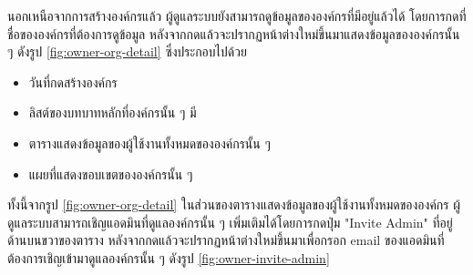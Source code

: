 \clearpage

นอกเหนือจากการสร้างองค์กรแล้ว ผู้ดูแลระบบยังสามารถดูข้อมูลขององค์กรที่มีอยู่แล้วได้ โดยการกดที่ชื่อขององค์กรที่ต้องการดูข้อมูล หลังจากกดแล้วจะปรากฏหน้าต่างใหม่ขึ้นมาแสดงข้อมูลขององค์กรนั้น ๆ ดังรูป \ref{fig:owner-org-detail} ซึ่งประกอบไปด้วย
\begin{itemize}
    \item วันที่กดสร้างองค์กร
    \item ลิสต์ของบทบาทหลักที่องค์กรนั้น ๆ มี
    \item ตารางแสดงข้อมูลของผู้ใช้งานทั้งหมดขององค์กรนั้น ๆ
    \item แผยที่แสดงขอบเขตขององค์กรนั้น ๆ
\end{itemize}
ทั้งนี้จากรูป \ref{fig:owner-org-detail} ในส่วนของตารางแสดงข้อมูลของผู้ใช้งานทั้งหมดขององค์กร ผู้ดูแลระบบสามารถเชิญแอดมินที่ดูแลองค์กรนั้น ๆ เพิ่มเติมได้โดยการกดปุ่ม "Invite Admin" ที่อยู่ด้านบนขวาของตาราง หลังจากกดแล้วจะปรากฏหน้าต่างใหม่ขึ้นมาเพื่อกรอก email ของแอดมินที่ต้องการเชิญเข้ามาดูแลองค์กรนั้น ๆ ดังรูป \ref{fig:owner-invite-admin}


\clearpage
{}
\fi